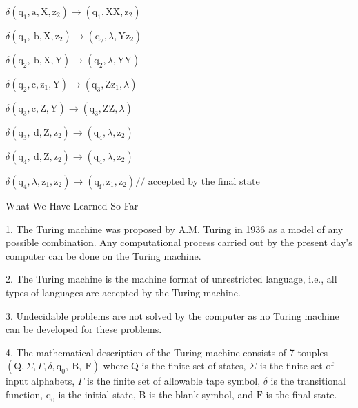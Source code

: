 \documentclass[8pt]{report}
\begin{document}
$\delta\left(\mathrm{q}_{1}, \mathrm{a}, \mathrm{X}, \mathrm{z}_{2}\right) \rightarrow\left(\mathrm{q}_{1}, \mathrm{XX}, \mathrm{z}_{2}\right)$

$\delta\left(\mathrm{q}_{1}, \mathrm{~b}, \mathrm{X}, \mathrm{z}_{2}\right) \rightarrow\left(\mathrm{q}_{2}, \lambda, \mathrm{Yz}_{2}\right)$

$\delta\left(\mathrm{q}_{2}, \mathrm{~b}, \mathrm{X}, \mathrm{Y}\right) \rightarrow\left(\mathrm{q}_{2}, \lambda, \mathrm{YY}\right)$

$\delta\left(\mathrm{q}_{2}, \mathrm{c}, \mathrm{z}_{1}, \mathrm{Y}\right) \rightarrow\left(\mathrm{q}_{3}, \mathrm{Zz}_{1}, \lambda\right)$

$\delta\left(\mathrm{q}_{3}, \mathrm{c}, \mathrm{Z}, \mathrm{Y}\right) \rightarrow\left(\mathrm{q}_{3}, \mathrm{ZZ}, \lambda\right)$

$\delta\left(\mathrm{q}_{3}, \mathrm{~d}, \mathrm{Z}, \mathrm{z}_{2}\right) \rightarrow\left(\mathrm{q}_{4}, \lambda, \mathrm{z}_{2}\right)$

$\delta\left(\mathrm{q}_{4}, \mathrm{~d}, \mathrm{Z}, \mathrm{z}_{2}\right) \rightarrow\left(\mathrm{q}_{4}, \lambda, \mathrm{z}_{2}\right)$

$\delta\left(\mathrm{q}_{4}, \lambda, \mathrm{z}_{1}, \mathrm{z}_{2}\right) \rightarrow\left(\mathrm{q}_{\mathrm{f}}, \mathrm{z}_{1}, \mathrm{z}_{2}\right) / /$ accepted by the final state



\begin{center}
	What We Have Learned So Far
\end{center}



1. The Turing machine was proposed by A.M. Turing in 1936 as a model of any possible combination. Any computational process carried out by the present day's computer can be done on the Turing machine.

2. The Turing machine is the machine format of unrestricted language, i.e., all types of languages are accepted by the Turing machine.

3. Undecidable problems are not solved by the computer as no Turing machine can be developed for these problems.

4. The mathematical description of the Turing machine consists of 7 touples $\left(\mathrm{Q}, \Sigma, \Gamma, \delta, \mathrm{q}_{0}, \mathrm{~B}, \mathrm{~F}\right)$ where $\mathrm{Q}$ is the finite set of states, $\Sigma$ is the finite set of input alphabets, $\Gamma$ is the finite set of allowable tape symbol, $\delta$ is the transitional function, $\mathrm{q}_{0}$ is the initial state, $\mathrm{B}$ is the blank symbol, and $\mathrm{F}$ is the final state.
\end{document}
